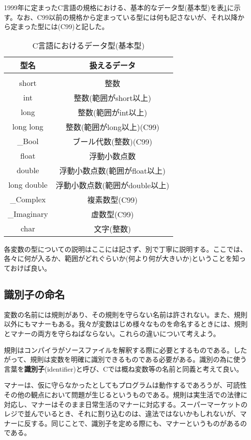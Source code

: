 1999年に定まったC言語の規格における、基本的なデータ型(基本型)を表\ref{clang_datatypelist}に示す。なお、C99以前の規格から定まっている型には何も記さないが、それ以降から定まった型には(C99)と記した。
\begin{table}[H]
\caption{C言語におけるデータ型(基本型)}
\centering
\begin{tabular}{|c|c|}\hline
型名&扱えるデータ\\ \hline
&\\[-16pt]\hline
short&整数\\ \hline
int&整数(範囲がshort以上)\\ \hline
long&整数(範囲がint以上)\\ \hline
long long&整数(範囲がlong以上)(C99)\\ \hline
\_Bool&ブール代数(整数)(C99)\\ \hline
float&浮動小数点数\\ \hline
double&浮動小数点数(範囲がfloat以上)\\ \hline
long double&浮動小数点数(範囲がdouble以上)\\ \hline
\_Complex&複素数型(C99)\\ \hline
\_Imaginary&虚数型(C99)\\ \hline
char&文字(整数)\\ \hline
\end{tabular}
\label{clang_datatypelist}
\end{table}

各変数の型についての説明はここには記さず、別で丁寧に説明する。ここでは、各々に何が入るか、範囲がどれぐらいか(何より何が大きいか)ということを知っておけば良い。

\subsection{識別子の命名}
変数の名前には規則があり、その規則を守らない名前は許されない。また、規則以外にもマナーもある。我々が変数はじめ様々なものを命名するときには、規則とマナーの両方を守らねばならない。これらの違いについて考えよう。

規則はコンパイラがソースファイルを解釈する際に必要とするものである。したがって、規則は変数を明確に識別できるものである必要がある。識別の為に使う言葉を\textbf{識別子}(identifier)と呼び、Cでは概ね変数等の名前と同義と考えて良い。

マナーは、仮に守らなかったとしてもプログラムは動作するであろうが、可読性その他の観点において問題が生じるというものである。規則は実生活での法律に対応し、マナーはそのまま日常生活のマナーに対応する。スーパーマーケットのレジで並んでいるとき、それに割り込むのは、違法ではないかもしれないが、マナーに反する。同じことで、識別子を定める際にも、マナーというものがあるのである。

